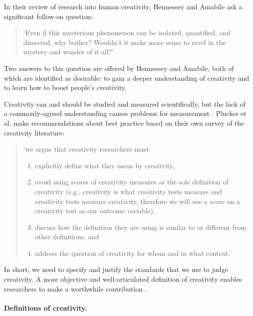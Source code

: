 \documentclass[10pt,letterpaper]{article}
\begin{document}
In their review of research into human creativity, Hennessey and Amabile ask a significant follow-on question: 
\begin{quote}
`Even if this mysterious phenomenon can be isolated, quantified, and dissected, why bother? Wouldn't it make more sense to revel in the mystery and wonder of it all?' 
\cite[p. 570]{hennessey10}
\end{quote}

\noindent Two answers to this question are offered by Hennessey and Amabile, both of which are identified as desirable: to gain a deeper understanding of creativity and to learn how to boost people's creativity.

Creativity can and should be studied and measured scientifically, but the lack of a commonly-agreed understanding causes problems for measurement \cite{kaufman09}. Plucker et al. make recommendations about best practice based on their own survey of the creativity literature:
\begin{quote}
\noindent
`we argue that creativity researchers must

\begin{enumerate}
\renewcommand{\labelenumi}{(\alph{enumi})}
\item explicitly define what they mean by creativity,
\item avoid using scores of creativity measures as the sole definition of creativity (e.g., creativity is what creativity tests measure and creativity tests measure creativity, therefore we will use a score on a creativity test as our outcome variable),
\item discuss how the definition they are using is similar to or different from other definitions, and
\item address the question of creativity for whom and in what context.' \cite[p.92]{plucker04defn}
\end{enumerate}
\end{quote}

\noindent In short, we need to specify and justify the standards that we use to judge creativity. A more objective and well-articulated definition of creativity enables researchers to make a worthwhile contribution \cite{torrance67,plucker04defn,kaufman09}. 

\paragraph{Definitions of creativity.}
\label{existing_defs}
\end{document}
